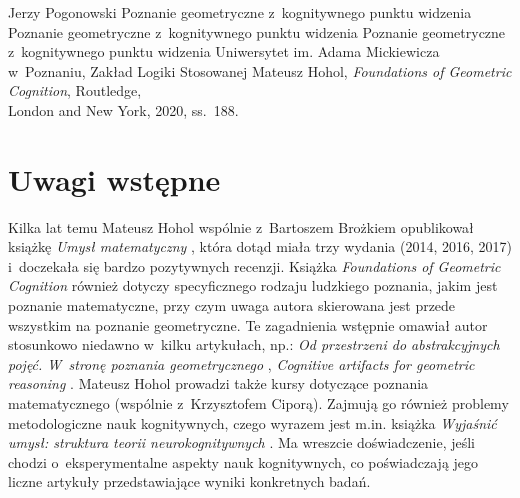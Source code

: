 \begin{newrevplenv}{Jerzy Pogonowski}
	{Poznanie geometryczne z~kognitywnego punktu widzenia}
	{Poznanie geometryczne z~kognitywnego punktu widzenia}
	{Poznanie geometryczne z~kognitywnego punktu widzenia}
	{Uniwersytet im. Adama Mickiewicza w~Poznaniu, Zakład Logiki Stosowanej}
	{Mateusz Hohol, {\em Foundations of Geometric Cognition},
	Routledge,\\
	London and New York, 2020, ss.~188.}








\section{Uwagi wstępne}

\lettrine[loversize=0.13,lines=2,lraise=-0.03,nindent=0em,findent=0.2pt]%
{K}{}ilka lat temu Mateusz Hohol wspólnie z~Bartoszem Brożkiem
opublikował książkę {\em Umysł matematyczny} \parencite{brozek_umysl_2014},
która dotąd miała trzy wydania (2014, 2016, 2017) i~doczekała się bardzo pozytywnych recenzji. Książka {\em
Foundations of Geometric Cognition} również dotyczy specyficznego
rodzaju ludzkiego poznania, jakim jest poznanie matematyczne, przy
czym uwaga autora skierowana jest przede wszystkim na poznanie
geometryczne. Te zagadnienia wstępnie omawiał autor stosunkowo
niedawno w~kilku artykułach, np.: \textit{Od przestrzeni do
abstrakcyjnych pojęć. W~stronę poznania geometrycznego} \parencite[, 
tekst odczytu wygłoszonego na V~Konferencji Filozofii Matematyki i~Informatyki, 
Poznań, 2016]{hohol_od_2018}, \textit{Cognitive artifacts for
geometric reasoning} \parencite{hohol_cognitive_2019}. Mateusz Hohol
prowadzi także kursy dotyczące poznania matematycznego (wspólnie z~Krzysztofem Ciporą). Zajmują go również problemy metodologiczne
nauk kognitywnych, czego wyrazem jest m.in. książka {\em Wyjaśnić
umysł: struktura teorii neurokognitywnych} \parencite{hohol_wyjasnic_2013}. Ma
wreszcie doświadczenie, jeśli chodzi o~eksperymentalne aspekty
nauk kognitywnych, co poświadczają jego liczne artykuły
przedstawiające wyniki konkretnych badań.


\end{newrevplenv}
